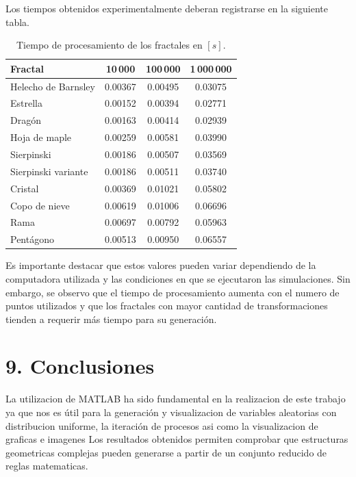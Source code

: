 \documentclass[12pt,a4paper]{article}
\begin{document}
Los tiempos obtenidos experimentalmente deberan registrarse en la siguiente
tabla.

\begin{table}[H]
\centering
\caption{Tiempo de procesamiento de los fractales en $[s]$.}
\label{tab:tiempos}
\begin{tabular}{lccc}
\toprule
\textbf{Fractal} &
\textbf{10\,000} &
\textbf{100\,000} &
\textbf{1\,000\,000} \\
\midrule
Helecho de Barnsley & 0.00367 & 0.00495 & 0.03075 \\
Estrella            & 0.00152 & 0.00394 & 0.02771 \\
Dragón              & 0.00163 & 0.00414 & 0.02939 \\
Hoja de maple       & 0.00259 & 0.00581 & 0.03990 \\
Sierpinski          & 0.00186 & 0.00507 & 0.03569 \\
Sierpinski variante & 0.00186 & 0.00511 & 0.03740 \\
Cristal             & 0.00369 & 0.01021 & 0.05802 \\
Copo de nieve       & 0.00619 & 0.01006 & 0.06696 \\
Rama                & 0.00697 & 0.00792 & 0.05963 \\
Pentágono           & 0.00513 & 0.00950 & 0.06557 \\
\bottomrule
\end{tabular}
\end{table}

Es importante destacar que estos valores pueden variar dependiendo de la computadora utilizada y las condiciones en que se ejecutaron las simulaciones. Sin embargo, se observo que el tiempo de procesamiento aumenta con el numero de puntos utilizados y que los fractales con mayor cantidad de transformaciones tienden a requerir más tiempo para su generación.


\section*{9. Conclusiones}

La utilizacion de MATLAB ha sido fundamental en la realizacion de este trabajo ya que nos es útil para la generación y visualizacion de variables aleatorias con distribucion uniforme, la iteración de procesos asi como la visualizacion de graficas e imagenes Los resultados obtenidos permiten comprobar que estructuras geometricas complejas pueden generarse a partir de un conjunto reducido de reglas matematicas.
\end{document}
